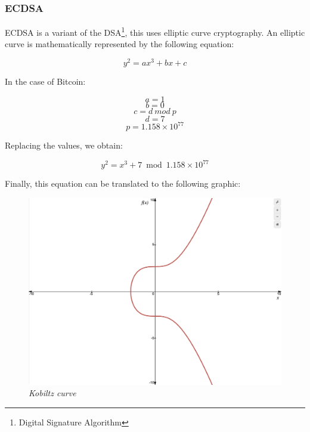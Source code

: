 \documentclass{article}
\newcommand\tab[1][1cm]{\hspace*{#1}}
\begin{document}
\subsubsection{ECDSA}

\tab ECDSA is a variant of the DSA\footnote{Digital Signature Algorithm}, this uses elliptic curve cryptography. An elliptic curve is mathematically represented by the following equation:

\[y^2 = ax^3 + bx + c\]

In the case of Bitcoin:

\[a = 1\]
\[b = 0\]
\[c = d\: mod\: p\]
\[d = 7\]
\[p = 1.158 \times 10^{77}\]

Replacing the values, we obtain:

\[y^2 = x^3 + 7 \bmod{1.158 \times 10^{77}}\]

Finally, this equation can be translated to the following graphic:

\vspace{5mm} %

\begin{figure}[H]
    \begin{center}
        \includegraphics[width=0.6 \textwidth]{images/Kobiltz_curve.png}
        \caption{\textit{Kobiltz curve}}
    \end{center}
\end{figure}

\vspace{5mm} %
\end{document}
